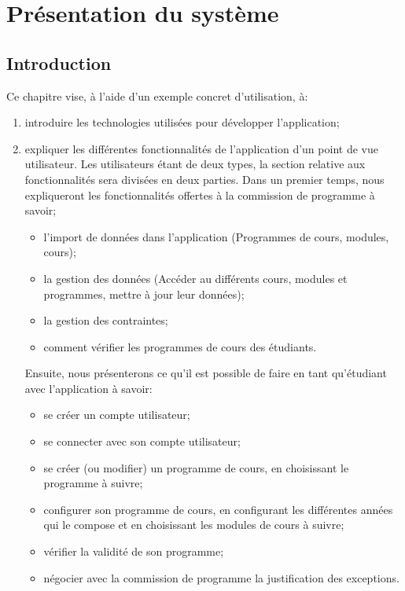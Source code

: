 \chapter{Présentation du système}
\label{presentation_systeme}
\section{Introduction}

Ce chapitre vise, à l'aide d'un exemple concret d'utilisation,  à:
\begin{enumerate}
\item introduire les technologies utilisées pour développer l'application;
\item expliquer les différentes fonctionnalités de l'application d'un point de vue utilisateur. Les utilisateurs étant de deux types, la section relative aux fonctionnalités sera divisées en deux parties. Dans un premier temps, nous expliqueront les fonctionnalités offertes à la commission de programme à savoir;
  \begin{itemize}
    \item l'import de données dans l'application (Programmes de cours, modules, cours);
    \item la gestion des données (Accéder au différents cours, modules et programmes, mettre à jour leur données);
    \item la gestion des contraintes;
    \item comment vérifier les programmes de cours des étudiants.
  \end{itemize}
Ensuite, nous présenterons ce qu'il est possible de faire en tant qu'étudiant avec l'application à savoir:
\begin{itemize}
  \item se créer un compte utilisateur;
  \item se connecter avec son compte utilisateur;
  \item se créer (ou modifier) un programme de cours, en choisissant le programme à suivre;
  \item configurer son programme de cours, en configurant les différentes années qui le compose et en choisissant les modules de cours à suivre;
  \item vérifier la validité de son programme;
  \item négocier avec la commission de programme la justification des exceptions. 
\end{itemize}
 
\end{enumerate}

